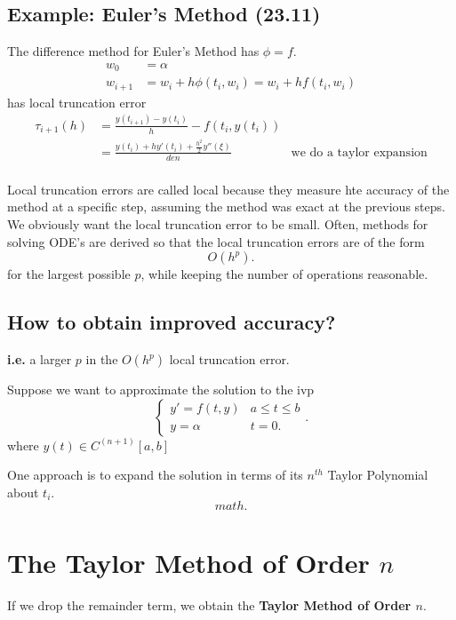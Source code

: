 \documentclass[12pt]{article}
\newcommand{\ie}{\textbf{i.e.}\xspace}
\begin{document}
\subsection{Example: Euler's Method (23.11)}
The difference method for Euler's Method has $\phi = f$.
\begin{align*}
  w_0 &= \alpha \\
  w_{i+1} &= w_i + h \phi(t_i, w_i) = w_i + h f(t_i, w_i)
\end{align*}
has local truncation error
\begin{align*}
  \tau_{i+1}(h) &= \frac{y(t_{i+1}) - y(t_i)}{h} - f(t_i, y(t_i)) \\
                &= \frac{y(t_i) + hy'(t_i) + \frac{h^2}{2}y''(\xi)}{den} & \text{we do a taylor expansion} \\
\end{align*}

Local truncation errors are called local because they measure hte accuracy of
the method at a specific step, assuming the method was exact at the previous
steps. We obviously want the local truncation error to be small. Often, methods
for solving ODE's are derived so that the local truncation errors are of the
form
\[
O(h^p)
.\]
for the largest possible $p$, while keeping the number of operations reasonable.

\subsection{How to obtain improved accuracy?}
\ie a larger $p$ in the $O(h^p)$ local truncation error.

Suppose we want to approximate the solution to the ivp 
\[
  \begin{cases}
    y' = f(t,y) & a \leq t \leq b\\
    y = \alpha & t = 0
  .\end{cases}
.\]
where $y(t) \in C^{(n+1)} [a,b]$

One approach is to expand the solution in terms of its $n^{th}$ Taylor
Polynomial about $t_i$.
\[
math
.\]

\section{The Taylor Method of Order $n$}
If we drop the remainder term, we obtain the \textbf{Taylor Method of Order $n$}.
\end{document}
